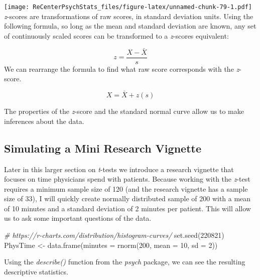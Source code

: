 \documentclass[
  11pt,
]{book}
\newenvironment{Shaded}{\begin{snugshade}}{\end{snugshade}}
\newcommand{\AttributeTok}[1]{\textcolor[rgb]{0.77,0.63,0.00}{#1}}
\newcommand{\CommentTok}[1]{\textcolor[rgb]{0.56,0.35,0.01}{\textit{#1}}}
\newcommand{\DecValTok}[1]{\textcolor[rgb]{0.00,0.00,0.81}{#1}}
\newcommand{\FunctionTok}[1]{\textcolor[rgb]{0.00,0.00,0.00}{#1}}
\newcommand{\NormalTok}[1]{#1}
\newcommand{\OtherTok}[1]{\textcolor[rgb]{0.56,0.35,0.01}{#1}}
\newcommand{\SpecialCharTok}[1]{\textcolor[rgb]{0.00,0.00,0.00}{#1}}
\begin{document}
\texttt{[image: ReCenterPsychStats\_files/figure-latex/unnamed-chunk-79-1.pdf]}
\emph{z}-scores are transformations of raw scores, in standard deviation units. Using the following formula, so long as the mean and standard deviation are known, any set of continuously scaled scores can be transformed to a \emph{z}-scores equivalent:

\[z=\frac{X-\bar{X}}{s}\]
We can rearrange the formula to find what raw score corresponds with the \emph{z}-score.

\[X = \bar{X} + z(s)\]

The properties of the \emph{z}-score and the standard normal curve allow us to make inferences about the data.

\hypertarget{simulating-a-mini-research-vignette}{%
\subsection{Simulating a Mini Research Vignette}\label{simulating-a-mini-research-vignette}}

Later in this larger section on \emph{t}-tests we introduce a research vignette that focuses on time physicians spend with patients. Because working with the \emph{z}-test requires a minimum sample size of 120 (and the research vignette has a sample size of 33), I will quickly create normally distributed sample of 200 with a mean of 10 minutes and a standard deviation of 2 minutes per patient. This will allow us to ask some important questions of the data.

\begin{Shaded}
\begin{Highlighting}[]
\CommentTok{\# https://r{-}charts.com/distribution/histogram{-}curves/}
\FunctionTok{set.seed}\NormalTok{(}\DecValTok{220821}\NormalTok{)}
\NormalTok{PhysTime }\OtherTok{\textless{}{-}} \FunctionTok{data.frame}\NormalTok{(}\AttributeTok{minutes =} \FunctionTok{rnorm}\NormalTok{(}\DecValTok{200}\NormalTok{, }\AttributeTok{mean =} \DecValTok{10}\NormalTok{, }\AttributeTok{sd =} \DecValTok{2}\NormalTok{))}
\end{Highlighting}
\end{Shaded}

Using the \emph{describe()} function from the \emph{psych} package, we can see the resulting descriptive statistics.

\begin{Shaded}
\end{Shaded}
\end{document}

